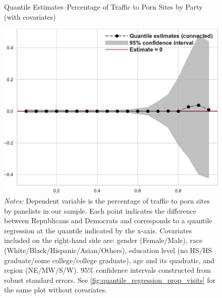 \documentclass[12pt, letterpaper]{article}
\begin{document}
\begin{figure}
	\centering
	\caption{Quantile Estimates--Percentage of Traffic to Porn Sites by Party (with covariates)}
	\includegraphics[width=.55\linewidth]{../figs/quantile_reg_covariates_proportion_visits_adult.pdf}
	\caption*{\footnotesize \emph{Notes:} 
		Dependent variable is the percentage of traffic to porn sites by panelists in our sample.
		Each point indicates the difference between Republicans and Democrats and corresponds to a quantile regression at the quantile indicated by the x-axis.
		Covariates included on the right-hand side are: gender (Female/Male), race (White/Black/Hispanic/Asian/Others), education level (no HS/HS graduate/some college/college graduate), age and its quadratic, and region (NE/MW/S/W).
		95\% confidence intervals constructed from robust standard errors.
		See \cref{fig:quantile_regression_prop_visits} for the same plot without covariates.
	}
	\label{fig:quantile_regression_prop_visits_covariates}
\end{figure}
\end{document}

